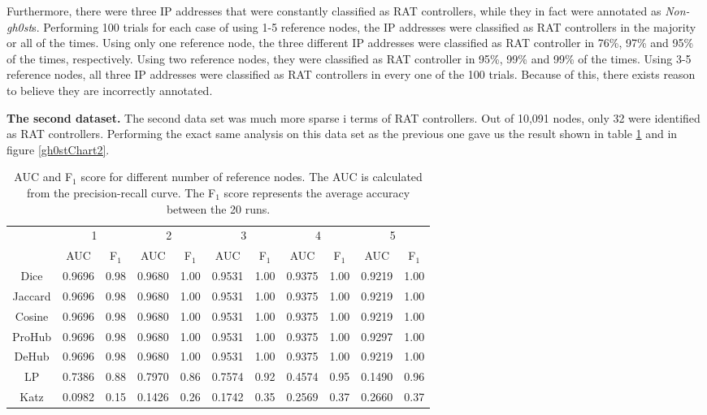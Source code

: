 Furthermore, there were three IP addresses that were constantly classified as RAT controllers, while they in fact were annotated as \textit{Non-gh0st}s. Performing 100 trials for each case of using 1-5 reference nodes, the IP addresses were classified as RAT controllers in the majority or all of the times. Using only one reference node, the three different IP addresses were classified as RAT controller in 76\%, 97\% and 95\% of the times, respectively. Using two reference nodes, they were classified as RAT controller in 95\%, 99\% and 99\% of the times. Using 3-5 reference nodes, all three IP addresses were classified as RAT controllers in every one of the 100 trials. Because of this, there exists reason to believe they are incorrectly annotated. 

\textbf{The second dataset.} The second data set was much more sparse i terms of RAT controllers. Out of 10,091 nodes, only 32 were identified as RAT controllers. Performing the exact same analysis on this data set as the previous one gave us the result shown in table \ref{aucIndex2} and in figure \ref{gh0stChart2}.

\begin{table}[h!]
    \centering
    \caption{AUC and F$_1$ score for different number of reference nodes. The AUC is calculated from the precision-recall curve. The F$_1$ score represents the average accuracy between the 20 runs.}
    \begin{tabular}{|c||c|c||c|c||c|c||c|c||c|c|}
      \hline
      \multirow{2}{*}{~} 
            & \multicolumn{2}{c||}{1}
            & \multicolumn{2}{c||}{2}
            & \multicolumn{2}{c||}{3}
            & \multicolumn{2}{c||}{4}
            & \multicolumn{2}{|c|}{5} \\             \cline{2-11}
      ~     &AUC&F$_1$&AUC&F$_1$&AUC&F$_1$&AUC&F$_1$&AUC&F$_1$ \\ \hline
    Dice    & 0.9696 & 0.98 & 0.9680 & 1.00 & 0.9531 & 1.00 & 0.9375 & 1.00 & 0.9219 & 1.00 \\
    Jaccard & 0.9696 & 0.98 & 0.9680 & 1.00 & 0.9531 & 1.00 & 0.9375 & 1.00 & 0.9219 & 1.00 \\
    Cosine  & 0.9696 & 0.98 & 0.9680 & 1.00 & 0.9531 & 1.00 & 0.9375 & 1.00 & 0.9219 & 1.00 \\
    ProHub  & 0.9696 & 0.98 & 0.9680 & 1.00 & 0.9531 & 1.00 & 0.9375 & 1.00 & 0.9297 & 1.00 \\
    DeHub   & 0.9696 & 0.98 & 0.9680 & 1.00 & 0.9531 & 1.00 & 0.9375 & 1.00 & 0.9219 & 1.00 \\ 
    LP      & 0.7386 & 0.88 & 0.7970 & 0.86 & 0.7574 & 0.92 & 0.4574 & 0.95 & 0.1490 & 0.96 \\
    Katz    & 0.0982 & 0.15 & 0.1426 & 0.26 & 0.1742 & 0.35 & 0.2569 & 0.37 & 0.2660 & 0.37 \\ \hline
    \end{tabular}
    \label{aucIndex2}
\end{table}

